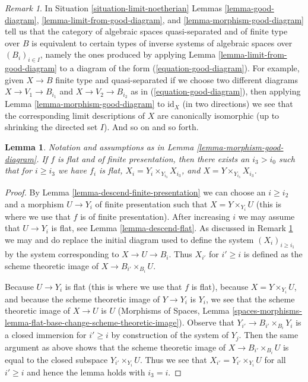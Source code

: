 \documentclass{stacks-project}
\theoremstyle{plain}
\newtheorem{lemma}[subsection]{Lemma}
\theoremstyle{definition}
\theoremstyle{remark}
\newtheorem{remark}[subsection]{Remark}
\numberwithin{equation}{subsection}
\begin{document}
\begin{remark}
\label{remark-finite-type-gives-well-defined-system}
In Situation \ref{situation-limit-noetherian}
Lemmas \ref{lemma-good-diagram}, \ref{lemma-limit-from-good-diagram}, and
\ref{lemma-morphism-good-diagram}
tell us that the category of algebraic spaces quasi-separated and
of finite type over $B$ is equivalent to certain types of
inverse systems of algebraic spaces over $(B_i)_{i \in I}$, namely
the ones produced by applying Lemma \ref{lemma-limit-from-good-diagram}
to a diagram of the form (\ref{equation-good-diagram}).
For example, given $X \to B$ finite type and quasi-separated
if we choose two different diagrams $X \to V_1 \to B_{i_1}$
and $X \to V_2 \to B_{i_2}$ as in (\ref{equation-good-diagram}), then
applying Lemma \ref{lemma-morphism-good-diagram} to $\text{id}_X$
(in two directions)
we see that the corresponding limit descriptions of
$X$ are canonically isomorphic (up to shrinking the
directed set $I$). And so on and so forth.
\end{remark}

\begin{lemma}
\label{lemma-morphism-good-diagram-flat}
Notation and assumptions as in Lemma \ref{lemma-morphism-good-diagram}.
If $f$ is flat and of finite presentation, then
there exists an $i_3 > i_0$ such that for $i \geq i_3$ we have
$f_i$ is flat, $X_i = Y_i \times_{Y_{i_3}} X_{i_3}$, and
$X = Y \times_{Y_{i_3}} X_{i_3}$.
\end{lemma}

\begin{proof}
By Lemma \ref{lemma-descend-finite-presentation}
we can choose an $i \geq i_2$ and a morphism
$U \to Y_i$ of finite presentation such that $X = Y \times_{Y_i} U$
(this is where we use that $f$ is of finite presentation).
After increasing $i$ we may assume that $U \to Y_i$ is flat, see
Lemma \ref{lemma-descend-flat}.
As discussed in Remark \ref{remark-finite-type-gives-well-defined-system}
we may and do replace the initial diagram used to define the system
$(X_i)_{i \geq i_1}$ by the system corresponding to
$X \to U \to B_i$. Thus $X_{i'}$ for $i' \geq i$ is defined as
the scheme theoretic image of $X \to B_{i'} \times_{B_i} U$.

\medskip\noindent
Because $U \to Y_i$ is flat (this is where we use that $f$ is flat),
because $X = Y \times_{Y_i} U$, and
because the scheme theoretic image of $Y \to Y_i$ is $Y_i$,
we see that the scheme theoretic image of $X \to U$ is $U$
(Morphisms of Spaces, Lemma
\ref{spaces-morphisms-lemma-flat-base-change-scheme-theoretic-image}).
Observe that $Y_{i'} \to B_{i'} \times_{B_i} Y_i$ is a closed
immersion for $i' \geq i$ by construction of the system of $Y_j$.
Then the same argument as above shows that the scheme theoretic image
of $X \to B_{i'} \times_{B_i} U$
is equal to the closed subspace $Y_{i'} \times_{Y_i} U$.
Thus we see that $X_{i'} = Y_{i'} \times_{Y_i} U$ for all $i' \geq i$
and hence the lemma holds with $i_3 = i$.
\end{proof}
\end{document}
